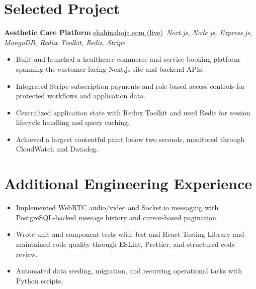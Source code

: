 \documentclass[11pt,a4paper,sans]{moderncv}
\begin{document}
\vspace{3pt}


\section{Selected Project}
\vspace{1pt}
\textbf{Aesthetic Care Platform} \hfill \href{https://shahinahoja.com/}{shahinahoja.com (live)}\
\textit{Next.js, Node.js, Express.js, MongoDB, Redux Toolkit, Redis, Stripe}
\begin{itemize}
\item {Built and launched a healthcare commerce and service-booking platform spanning the customer-facing Next.js site and backend APIs.}
\item {Integrated Stripe subscription payments and role-based access controls for protected workflows and application data.}
\item {Centralized application state with Redux Toolkit and used Redis for session lifecycle handling and query caching.}
\item {Achieved a largest contentful paint below two seconds, monitored through CloudWatch and Datadog.}
\end{itemize}

\section{Additional Engineering Experience}
\vspace{1pt}
\begin{itemize}
    \item {Implemented WebRTC audio/video and Socket.io messaging with PostgreSQL-backed message history and cursor-based pagination.}
    \item {Wrote unit and component tests with Jest and React Testing Library and maintained code quality through ESLint, Prettier, and structured code review.}
    \item {Automated data seeding, migration, and recurring operational tasks with Python scripts.}
\end{itemize}
\end{document}
